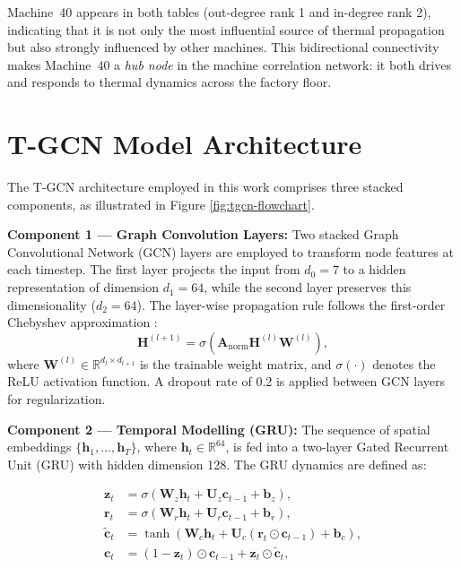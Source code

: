 Machine~40 appears in both tables (out-degree rank 1 and in-degree rank 2), indicating that it is not only the most influential source of thermal propagation but also strongly influenced by other machines. This bidirectional connectivity makes Machine~40 a \emph{hub node} in the machine correlation network: it both drives and responds to thermal dynamics across the factory floor.

\section{T-GCN Model Architecture}
The T-GCN architecture employed in this work comprises three stacked components, as illustrated in Figure \ref{fig:tgcn-flowchart}.

\textbf{Component 1 — Graph Convolution Layers:}
Two stacked Graph Convolutional Network (GCN) layers are employed to transform node features at each timestep. The first layer projects the input from $d_0 = 7$ to a hidden representation of dimension $d_1 = 64$, while the second layer preserves this dimensionality ($d_2 = 64$). The layer-wise propagation rule follows the first-order Chebyshev approximation \cite{kipf2017semi}:
\begin{equation}
\mathbf{H}^{(l+1)} = \sigma\!\left( \mathbf{A}_{\text{norm}} \mathbf{H}^{(l)} \mathbf{W}^{(l)} \right),
\end{equation}
where $\mathbf{W}^{(l)} \in \mathbb{R}^{d_l \times d_{l+1}}$ is the trainable weight matrix, and $\sigma(\cdot)$ denotes the ReLU activation function. A dropout rate of 0.2 is applied between GCN layers for regularization.

\textbf{Component 2 — Temporal Modelling (GRU):}
The sequence of spatial embeddings $\{\mathbf{h}_1, \ldots, \mathbf{h}_T\}$, where $\mathbf{h}_t \in \mathbb{R}^{64}$, is fed into a two-layer Gated Recurrent Unit (GRU) with hidden dimension 128. The GRU dynamics are defined as:

\begin{align}
\mathbf{z}_t &= \sigma\!\left( \mathbf{W}_z \mathbf{h}_t + \mathbf{U}_z \mathbf{c}_{t-1} + \mathbf{b}_z \right), \\
\mathbf{r}_t &= \sigma\!\left( \mathbf{W}_r \mathbf{h}_t + \mathbf{U}_r \mathbf{c}_{t-1} + \mathbf{b}_r \right), \\
\tilde{\mathbf{c}}_t &= \tanh\!\left( \mathbf{W}_c \mathbf{h}_t + \mathbf{U}_c (\mathbf{r}_t \odot \mathbf{c}_{t-1}) + \mathbf{b}_c \right), \\
\mathbf{c}_t &= (1 - \mathbf{z}_t) \odot \mathbf{c}_{t-1} + \mathbf{z}_t \odot \tilde{\mathbf{c}}_t,
\end{align}

